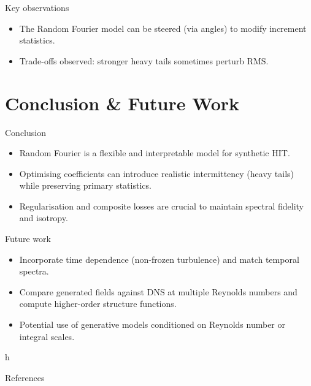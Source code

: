 \documentclass[11pt]{beamer}
\begin{document}
\begin{frame}{Key observations}
  \begin{itemize}
    \item The Random Fourier model can be steered (via angles) to modify increment statistics.
    \item Trade-offs observed: stronger heavy tails sometimes perturb RMS.
  \end{itemize}
\end{frame}

\section{Conclusion \& Future Work}
\begin{frame}{Conclusion}
  \begin{itemize}
    \item Random Fourier is a flexible and interpretable model for synthetic HIT.
    \item Optimising coefficients can introduce realistic intermittency (heavy tails) while preserving primary statistics.
    \item Regularisation and composite losses are crucial to maintain spectral fidelity and isotropy.
  \end{itemize}
\end{frame}

\begin{frame}{Future work}
  \begin{itemize}
    \item Incorporate time dependence (non-frozen turbulence) and match temporal spectra.
    \item Compare generated fields against DNS at multiple Reynolds numbers and compute higher-order structure functions.
    \item Potential use of generative models conditioned on Reynolds number or integral scales.
  \end{itemize}
\end{frame}
h


\begin{frame}[allowframebreaks]{References}
\end{frame}
\end{document}
